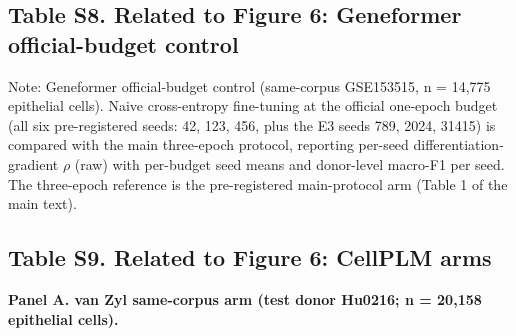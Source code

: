 \documentclass[12pt,a4paper]{article}
\begin{document}
\needspace{45mm}
\subsection*{Table S8. Related to Figure 6: Geneformer official-budget control}
\label{tab:S8}

\begingroup
\small
\centering
{}
\endgroup

Note: Geneformer official-budget control (same-corpus GSE153515, n = 14,775 epithelial cells). Naive cross-entropy fine-tuning at the official one-epoch budget (all six pre-registered seeds: 42, 123, 456, plus the E3 seeds 789, 2024, 31415) is compared with the main three-epoch protocol, reporting per-seed differentiation-gradient $\rho$ (raw) with per-budget seed means and donor-level macro-F1 per seed. The three-epoch reference is the pre-registered main-protocol arm (Table 1 of the main text).

\needspace{45mm}
\subsection*{Table S9. Related to Figure 6: CellPLM arms}
\label{tab:S9}

\textbf{Panel A. van Zyl same-corpus arm (test donor Hu0216; n = 20,158 epithelial cells).}

\medskip
\begingroup
\small
\centering
{}
\endgroup
\end{document}
